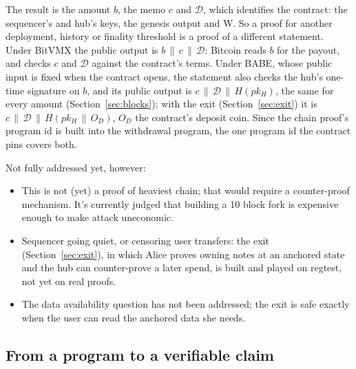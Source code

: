 \documentclass[11pt]{article}
\begin{document}
The result is the amount $b$, the memo $c$ and $\mathcal{D}$, which identifies the contract: the sequencer's and hub's keys, the genesis output and W. So a proof for another deployment, history or finality threshold is a proof of a different statement. Under BitVMX the public output is $b \,\|\, c \,\|\, \mathcal{D}$: Bitcoin reads $b$ for the payout, and checks $c$ and $\mathcal{D}$ against the contract's terms. Under BABE, whose public input is fixed when the contract opens, the statement also checks the hub's one-time signature on $b$, and its public output is $c \,\|\, \mathcal{D} \,\|\, H(pk_H)$, the same for every amount (Section~\ref{sec:blocks}); with the exit (Section~\ref{sec:exit}) it is $c \,\|\, \mathcal{D} \,\|\, H(pk_H \,\|\, O_D)$, $O_D$ the contract's deposit coin. Since the chain proof's program id is built into the withdrawal program, the one program id the contract pins covers both.

Not fully addressed yet, however:

\begin{itemize}
\item This is not (yet) a proof of heaviest chain; that would require a counter-proof mechanism. It's currently judged that building a 10 block fork is expensive enough to make attack uneconomic.
\item Sequencer going quiet, or censoring user transfers: the exit (Section~\ref{sec:exit}), in which Alice proves owning notes at an anchored state and the hub can counter-prove a later spend, is built and played on regtest, not yet on real proofs.
\item The data availability question has not been addressed; the exit is safe exactly when the user can read the anchored data she needs.
\end{itemize}

\subsection{From a program to a verifiable claim}
\end{document}
